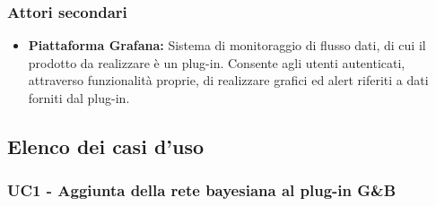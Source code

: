\subsubsection*{Attori secondari}
\begin{itemize}
\item \textbf{Piattaforma Grafana:} Sistema di monitoraggio di flusso dati, di cui il prodotto da realizzare è un plug-in. Consente agli utenti autenticati, attraverso funzionalità proprie, di realizzare grafici ed alert riferiti a dati forniti dal plug-in.
\end{itemize}

\subsection{Elenco dei casi d'uso}


\subsubsection{UC1 - Aggiunta della rete bayesiana al plug-in G\&B}\label{UC1}

